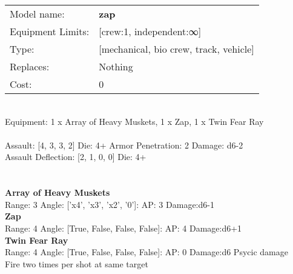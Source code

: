 \noindent
\begin{tabular}{ll}
Model name: &{\bf zap } \\
Equipment Limits: &[crew:1, independent:∞] \\
Type: &[mechanical, bio crew, track, vehicle] \\
Replaces: &Nothing \\
Cost: & 0\\
\end{tabular}
\ \\
Equipment: 1 x Array of Heavy Muskets, 1 x Zap, 1 x Twin Fear Ray \\
\ \\
Assault: [4, 3, 3, 2] Die: 4+ Armor Penetration: 2 Damage: d6-2 \\
Assault Deflection: [2, 1, 0, 0] Die: 4+\\
\indent  
\ \\

\ \\
{\bf Array of Heavy Muskets } \\



Range: 3  Angle: ['x4', 'x3', 'x2', '0']: AP: 3 Damage:d6-1 \\




{\bf Zap } \\



Range: 4  Angle: [True, False, False, False]: AP: 4 Damage:d6+1 \\




{\bf Twin Fear Ray } \\



Range: 4  Angle: [True, False, False, False]: AP: 0 Damage:d6 Psycic damage \\
Fire two times per shot at same target\\ 




 
\ \\



